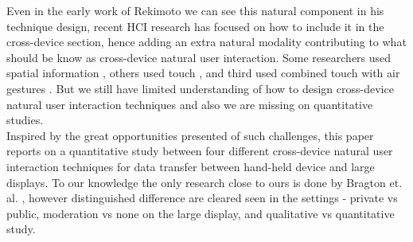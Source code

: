 Even in the early work of Rekimoto we can see this natural component in his technique design, recent HCI research has focused on how to include it in the cross-device section, hence adding an extra natural modality contributing to what should be know as cross-device natural user interaction.  Some researchers used spatial information \cite{Marquardt:2011, Marquardt:2012}, others used touch \cite{Seifert:2012}, and third used combined touch with air gestures \cite{Bragdon:2011} . But we still have limited understanding of how to design cross-device natural user interaction techniques and also we are missing on quantitative studies.\\

Inspired by the great opportunities presented of such challenges, this paper reports on a quantitative study between four different cross-device natural user interaction techniques for data transfer between hand-held device and large displays. To our knowledge the only research close to ours is done by Bragton et. al. \cite{Bragdon:2011}, however distinguished difference are cleared seen in the settings - private vs public, moderation vs none on the large display, and qualitative vs quantitative study.

